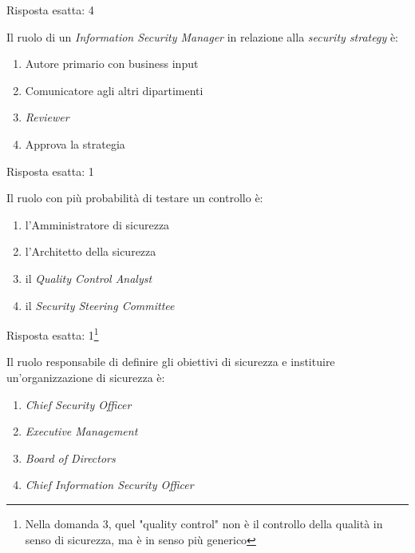 \begin{Answer} [
  ref={esSA2},
  number={2}
  ]

  \Question Risposta esatta: 4
\end{Answer}


\begin{Exercise} [
  title={Quiz},
  label={esSA3}
  ]

  \Question Il ruolo di un \textit{Information Security Manager} in relazione 
alla \textit{security strategy} è:
\begin{enumerate}
 \item Autore primario con business input
 \item Comunicatore agli altri dipartimenti
 \item \textit{Reviewer}
 \item Approva la strategia
\end{enumerate}
  
\end{Exercise}

\begin{Answer} [
  ref={esSA3},
  number={3}
  ]

  \Question Risposta esatta: 1
\end{Answer}



\begin{Exercise} [
  title={Quiz},
  label={esSA4}
  ]

  \Question Il ruolo con più probabilità di testare un controllo è:
  \begin{enumerate}
   \item l'Amministratore di sicurezza
   \item l'Architetto della sicurezza
   \item il \textit{Quality Control Analyst}
   \item il \textit{Security Steering Committee}
  \end{enumerate}

\end{Exercise}

\begin{Answer} [
  ref={esSA4},
  number={4}
  ]

  \Question Risposta esatta: 1\footnote{Nella domanda 3, quel "quality control" 
non è il controllo della qualità in senso di sicurezza, ma è in senso più 
generico}
\end{Answer}


\begin{Exercise} [
  title={Quiz},
  label={esSA5}
  ]

  \Question Il ruolo responsabile di definire gli obiettivi di sicurezza e 
instituire un'organizzazione di sicurezza è:
\begin{enumerate}
 \item \textit{Chief Security Officer}
 \item \textit{Executive Management}
 \item \textit{Board of Directors}
 \item \textit{Chief Information Security Officer}
\end{enumerate}

\end{Exercise}

